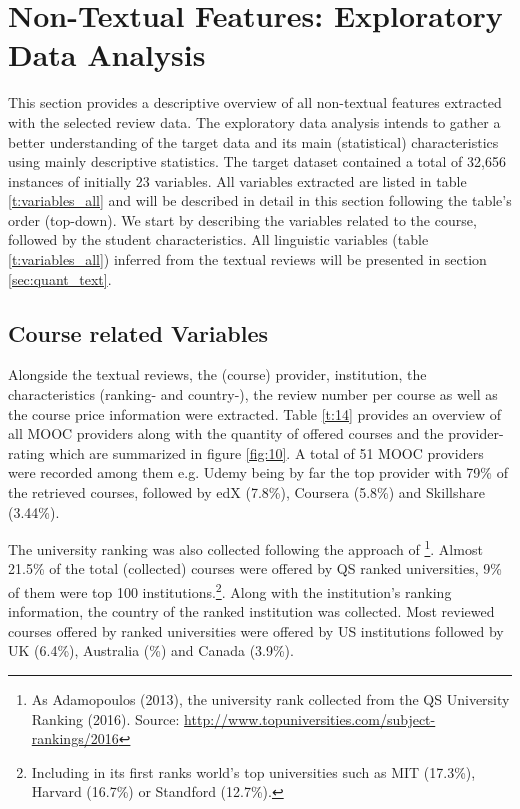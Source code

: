\documentclass[
	a4paper,
	pdftex,
	12pt,	
	footinclude=true,
	fleqn,
	final,
	]{report}%
\begin{document}
\section{Non-Textual Features: Exploratory Data Analysis}
\label{sec:exploratory}
\vspace{-0.3cm}
This section provides a descriptive overview of all non-textual
features extracted with the selected review data.
The exploratory data analysis intends to gather a better understanding of 
the target data and its main (statistical) characteristics using mainly 
descriptive statistics. The target dataset contained a total of 
32,656 instances of initially 23 variables. All variables extracted are 
listed in table \ref{t:variables_all} and will be described in detail 
in this section following the table's order (top-down). 
We start by describing the variables related to the course, followed by the student characteristics. 
All linguistic variables (table \ref{t:variables_all}) inferred from the textual reviews 
will be presented in section \ref{sec:quant_text}.

\vspace{-0.45cm}
\subsection{Course related Variables}
\label{sec:variables}
\vspace{-0.3cm}
Alongside the textual reviews, the (course) provider, institution, the 
characteristics (ranking- and country-), the review number per course as well as the 
course price information were extracted. Table \ref{t:14} provides an 
overview of all MOOC providers along with the quantity of offered 
courses and the provider-rating which are summarized in figure \ref{fig:10}. 
A total of 51 MOOC providers were recorded among them e.g. Udemy being by far the top 
provider with 79\% of the retrieved courses, followed by edX (7.8\%), Coursera (5.8\%) 
and Skillshare (3.44\%). 

The university ranking was also collected following the approach of \cite{Adamopoulos2013}\footnote{ 
As Adamopoulos (2013), the university rank collected from the QS University Ranking (2016).
Source: \url{http://www.topuniversities.com/subject-rankings/2016}}. Almost 21.5\% of the 
total (collected) courses were offered by QS ranked universities, 9\% of them were
top 100 institutions.\footnote{Including in its first ranks world's top universities 
such as MIT (17.3\%), Harvard (16.7\%) or Standford (12.7\%).}. Along with the institution's 
ranking information, the country of the ranked institution was collected. 
Most reviewed courses offered by ranked universities were offered by US institutions
followed by UK (6.4\%), Australia (\%) and Canada (3.9\%).
\end{document}
